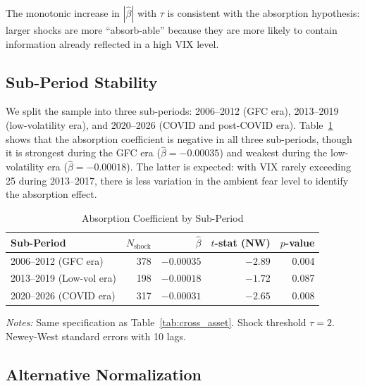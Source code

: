 \documentclass[12pt,a4paper]{article}
\begin{document}
The monotonic increase in $|\hat{\beta}|$ with $\tau$ is consistent with the absorption hypothesis: larger shocks are more ``absorb-able'' because they are more likely to contain information already reflected in a high VIX level.

\subsection{Sub-Period Stability}

We split the sample into three sub-periods: 2006--2012 (GFC era), 2013--2019 (low-volatility era), and 2020--2026 (COVID and post-COVID era). Table~\ref{tab:robust_subperiod} shows that the absorption coefficient is negative in all three sub-periods, though it is strongest during the GFC era ($\hat{\beta} = -0.00035$) and weakest during the low-volatility era ($\hat{\beta} = -0.00018$). The latter is expected: with VIX rarely exceeding 25 during 2013--2017, there is less variation in the ambient fear level to identify the absorption effect.

\begin{table}[H]
\centering
\caption{Absorption Coefficient by Sub-Period}
\label{tab:robust_subperiod}
\begin{threeparttable}
\begin{tabular}{lrrrr}
\toprule
Sub-Period & $N_{\text{shock}}$ & $\hat{\beta}$ & $t$-stat (NW) & $p$-value \\
\midrule
2006--2012 (GFC era)     & 378 & $-0.00035$ & $-2.89$ & 0.004 \\
2013--2019 (Low-vol era) & 198 & $-0.00018$ & $-1.72$ & 0.087 \\
2020--2026 (COVID era)   & 317 & $-0.00031$ & $-2.65$ & 0.008 \\
\bottomrule
\end{tabular}
\begin{tablenotes}
\small
\item \textit{Notes:} Same specification as Table~\ref{tab:cross_asset}. Shock threshold $\tau = 2$. Newey-West standard errors with 10 lags.
\end{tablenotes}
\end{threeparttable}
\end{table}

\subsection{Alternative Normalization}
\end{document}
